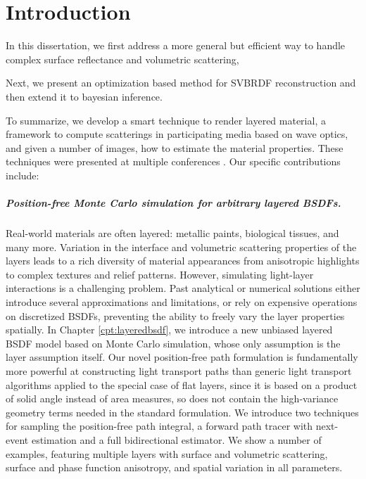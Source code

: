 \chapter{Introduction}
\label{cpt:introduction}

In this dissertation, we first address a more general but efficient way to handle complex surface reflectance and volumetric scattering, 


Next, we present an optimization based method for SVBRDF reconstruction and then extend it to bayesian inference.

To summarize, we develop a smart technique to render layered material, a framework to compute scatterings in participating media based on wave optics, and given a number of images, how to estimate the material properties. 
These techniques were presented at multiple conferences \cite{guo2018position, guo2020materialgan, guo2020bayesian}. Our specific contributions include:

\paragraph{Position-free Monte Carlo simulation for arbitrary layered BSDFs.}
Real-world materials are often layered: metallic paints, biological tissues, and many more. Variation in the interface and volumetric scattering properties of the layers leads to a rich diversity of material appearances from anisotropic highlights to complex textures and relief patterns. However, simulating light-layer interactions is a challenging problem. Past analytical or numerical solutions either introduce several approximations and limitations, or rely on expensive operations on discretized BSDFs, preventing the ability to freely vary the layer properties spatially. 
In Chapter \ref{cpt:layeredbsdf}, we introduce a new unbiased layered BSDF model based on Monte Carlo simulation, whose only assumption is the layer assumption itself. Our novel position-free path formulation is fundamentally more powerful at constructing light transport paths than generic light transport algorithms applied to the special case of flat layers, since it is based on a product of solid angle instead of area measures, so does not contain the high-variance geometry terms needed in the standard formulation. We introduce two techniques for sampling the position-free path integral, a forward path tracer with next-event estimation and a full bidirectional estimator. We show a number of examples, featuring multiple layers with surface and volumetric scattering, surface and phase function anisotropy, and spatial variation in all parameters.


